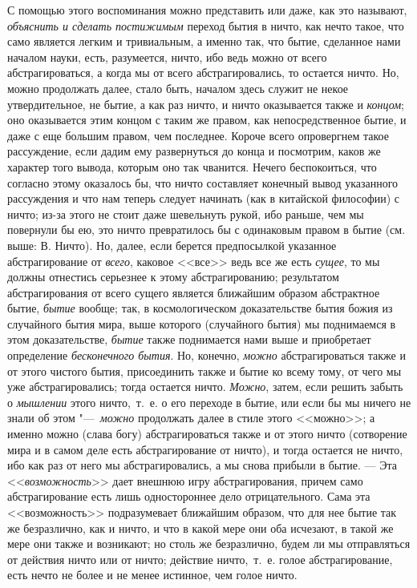 С помощью этого воспоминания можно представить или даже, как это называют,
{\em объяснить и сделать постижимым} переход бытия в
ничто, как нечто такое, что само является легким и тривиальным, а именно
так, что бытие, сделанное нами началом науки, есть, разумеется, ничто, ибо
ведь можно от всего абстрагироваться, а когда мы от всего абстрагировались,
то остается ничто. Но, можно продолжать далее, стало быть, началом здесь
служит не некое утвердительное, не бытие, а как раз ничто, и ничто
оказывается также и {\em концом}; оно оказывается этим
концом с таким же правом, как непосредственное бытие, и даже с еще большим
правом, чем последнее. Короче всего опровергнем такое рассуждение, если
дадим ему развернуться до конца и посмотрим, каков же характер того вывода,
которым оно так чванится. Нечего беспокоиться, что согласно этому оказалось
бы, что ничто составляет конечный вывод указанного рассуждения и что нам
теперь следует начинать (как в китайской философии) с ничто; из-за этого не
стоит даже шевельнуть рукой, ибо раньше, чем мы повернули бы ею, это ничто
превратилось бы с одинаковым правом в бытие (см. выше: В. Ничто). Но,
далее, если берется предпосылкой указанное абстрагирование от
{\em всего}, каковое <<все>> ведь все же есть
{\em сущее}, то мы должны отнестись серьезнее к этому
абстрагированию; результатом абстрагирования от всего сущего является
ближайшим образом абстрактное бытие, {\em бытие}
вообще; так, в космологическом доказательстве бытия божия из случайного
бытия мира, выше которого (случайного бытия) мы поднимаемся в этом
доказательстве, {\em бытие} также поднимается нами выше
и приобретает определение {\em бесконечного бытия}. Но,
конечно, {\em можно} абстрагироваться также и от этого
чистого бытия, присоединить также и бытие ко всему тому, от чего мы уже
абстрагировались; тогда остается ничто. {\em Можно},
затем, если решить забыть о {\em мышлении} этого
ничто,~т.~е. о его переходе в бытие, или если бы мы ничего не знали об этом
"---~{\em можно} продолжать далее в стиле этого <<можно>>; а
именно можно (слава богу) абстрагироваться также и от этого ничто
(сотворение мира и в самом деле есть абстрагирование от ничто), и тогда
остается не ничто, ибо как раз от него мы абстрагировались, а мы снова
прибыли в бытие. --- Эта <<{\em возможность}>> дает внешнюю
игру абстрагирования, причем само абстрагирование есть лишь одностороннее
дело отрицательного. Сама эта <<возможность>> подразумевает ближайшим
образом, что для нее бытие так же безразлично, как и ничто, и что в какой
мере они оба исчезают, в такой же мере они также и возникают; но столь же
безразлично, будем ли мы отправляться от действия ничто или от ничто;
действие ничто,~т.~е. голое абстрагирование, есть нечто не более и не менее
истинное, чем голое ничто.

